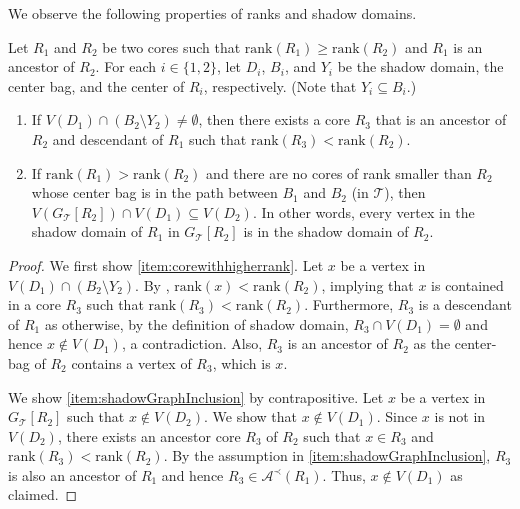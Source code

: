 \documentclass{article}
\newcommand{\mt}{\mathcal{T}}
\newcommand{\rank}{\mathrm{rank}}
\def\core{R}
\def\centre{Y}
\begin{document}
We observe the following properties of ranks and shadow domains.


\begin{lemma} \label{lemma:cores}
	Let $\core_1$ and $\core_2$ be two cores such that $ \rank(\core_1)\geq \rank(\core_2)$ and $\core_1$ is an ancestor of $\core_2$. For each $i\in \{1,2\}$, let $D_i$, $B_i$, and $Y_i$ be the shadow domain, the center bag, and the center of $R_i$, respectively. (Note that $Y_i\subseteq B_i$.) 
	\begin{enumerate}
		\item \label{item:corewithhigherrank} If $V(D_1) \cap (B_2\setminus \centre_2)\not= \emptyset$, then there exists a  core $\core_3$ that is an ancestor of $\core_2$ and descendant of $\core_1$  such that $\rank(\core_3) < \rank(\core_2)$.
		\item \label{item:shadowGraphInclusion} If  $ \rank(\core_1) > \rank(\core_2)$ and there are no cores of rank smaller than $\core_2$ whose center bag is in the path between $B_1$ and $B_2$ (in $\mt$), then $V(G_{\mt}[\core_2])\cap V(D_1) \subseteq V(D_2)$. In other words,  every vertex in the shadow domain of $\core_1$ in $G_{\mt}[\core_2]$ is in the shadow domain of $\core_2$.
	\end{enumerate}
\end{lemma}
\begin{proof} We first show \cref{item:corewithhigherrank}. Let $x$ be a vertex in $V(D_1)\cap (B_2\setminus \centre_2)$. By , $\rank(x) < \rank(\core_2)$, implying that $x$ is contained in a core $\core_3$ such that $\rank(\core_3) < \rank(\core_2)$.  Furthermore, $\core_3$ is a descendant of $\core_1$ as otherwise, by the definition of shadow domain, $\core_3\cap V(D_1) = \emptyset$ and hence $x\not\in V(D_1)$, a contradiction. Also, $\core_3$ is an ancestor of $\core_2$ as the center-bag of $\core_2$ contains a vertex of $\core_3$, which is $x$. 
	
	We show \cref{item:shadowGraphInclusion} by contrapositive. Let $x$ be a vertex in $G_{\mt}[\core_2]$ such that  $x \not\in V(D_2)$. We show that $x \not\in V(D_1)$. Since $x$ is not in $V(D_2)$,  there exists an ancestor core  $\core_3$ of $\core_2$ such that $x\in \core_3$ and $\rank(\core_3) < \rank(\core_2)$. By the assumption in \cref{item:shadowGraphInclusion}, $\core_3$ is also an ancestor of $\core_1$ and hence $R_3\in \mathcal{A}^{\prec}(R_1)$. Thus,  $x \not \in V(D_1)$ as claimed. 
\end{proof}
\end{document}
